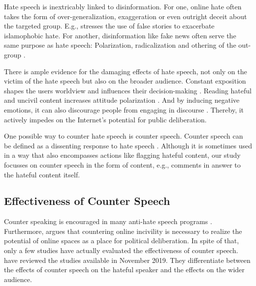 \documentclass[runningheads]{llncs}
\begin{document}
Hate speech is inextricably linked to disinformation. For one, online hate often takes the form of over-generalization, exaggeration or even outright deceit about the targeted group. E.g., \textcite{awanIslamophobiaSocialMedia2016} stresses the use of false stories to exacerbate islamophobic hate. For another, disinformation like fake news often serve the same purpose as hate speech: Polarization, radicalization and othering of the out-group \autocite{bennettDisinformationOrderDisruptive2018}.

There is ample evidence for the damaging effects of hate speech, not only on the victim of the hate speech but also on the broader audience.
Constant exposition shapes the users worldview and influences their decision-making \autocite{jubanyBackgroundsExperiencesResponses2016,erjavecReadersOnlineNews2014}.
Reading hateful and uncivil content increases attitude polarization \autocite{borahDoesItMatter2014,kimIncivilityFacebookPolitical2019}.
And by inducing negative emotions, it can also discourage people from engaging in discourse \autocite{hwangDoesCivilityMatter22,hwangSeeingBelievingEffects2014,kimIncivilityFacebookPolitical2019,molinaRoleCivilityMetacommunication2018}. Thereby, it actively impedes on the Internet's potential for public deliberation.

One possible way to counter hate speech is counter speech. Counter speech can be defined as a dissenting response to hate speech \autocite{wrightVectorsCounterspeechTwitter2017}.
Although it is sometimes used in a way that also encompasses actions like flagging hateful content, our study focusses on counter speech in the form of content, e.g., comments in answer to the hateful content itself.

\hypertarget{effectiveness-of-counter-speech}{%
\subsection{Effectiveness of Counter Speech}\label{effectiveness-of-counter-speech}}

Counter speaking is encouraged in many anti-hate speech programs \autocite{gagliardoneCounteringOnlineHate2015}. Furthermore, \textcite{chenOnlineIncivilityPublic2017} argues that countering online incivility is necessary to realize the potential of online spaces as a place for political deliberation. In spite of that, only a few studies have actually evaluated the effectiveness of counter speech. \textcite{buergerCounterspeechLiteratureReview2019} have reviewed the studies available in November 2019. They differentiate between the effects of counter speech on the hateful speaker and the effects on the wider audience.
\end{document}
